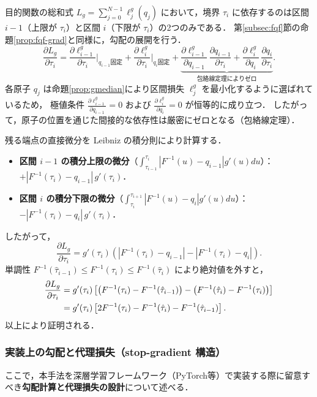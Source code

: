 \documentclass[a4paper,10pt]{jsarticle}
\makeatletter
\theoremstyle{definition}
\renewenvironment{proof}[1][\proofname]{\par
  \pushQED{\qed}%
  \normalfont \topsep6\p@\@plus6\p@\relax
  \trivlist
  \item[\hskip\labelsep\textbf{#1}]\ignorespaces
}{%
  \popQED\endtrivlist\@endpefalse
}
\renewcommand{\proofname}{証明}
\renewcommand{\Finv}{F^{-1}}
\makeatother
\begin{document}
\begin{proof}
目的関数の総和式 $L_g = \sum_{j=0}^{N-1} \ell_j^g(q_j)$ において，境界 $\tau_i$ に依存するのは区間 $i-1$（上限が $\tau_i$）と区間 $i$（下限が $\tau_i$）の2つのみである．
第\ref{subsec:fqf}節の命題\ref{prop:fqf-grad}と同様に，勾配の展開を行う．
\begin{equation}
  \frac{\partial L_g}{\partial\tau_i} = \frac{\partial \ell_{i-1}^g}{\partial\tau_i}\Bigg|_{q_{i-1}\text{固定}} + \frac{\partial \ell_i^g}{\partial\tau_i}\Bigg|_{q_i\text{固定}} + \underbrace{\frac{\partial \ell_{i-1}^g}{\partial q_{i-1}}\,\frac{\partial q_{i-1}}{\partial\tau_i} + \frac{\partial \ell_i^g}{\partial q_i}\,\frac{\partial q_i}{\partial\tau_i}}_{\text{包絡線定理によりゼロ}}.
\end{equation}
各原子 $q_j$ は命題\ref{prop:gmedian}により区間損失 $\ell_j^g$ を最小化するように選ばれているため，
極値条件 $\frac{\partial \ell_{i-1}^g}{\partial q_{i-1}} = 0$ および $\frac{\partial \ell_i^g}{\partial q_i} = 0$ が恒等的に成り立つ．
したがって，原子の位置を通じた間接的な依存性は厳密にゼロとなる（包絡線定理）．

残る端点の直接微分を Leibniz の積分則により計算する．
\begin{itemize}
  \item \textbf{区間 $i-1$ の積分上限の微分}（$\int_{\tau_{i-1}}^{\tau_i} |\Finv(u) - q_{i-1}| g'(u)du$）：
  $+|\Finv(\tau_i) - q_{i-1}|\,g'(\tau_i)$．
  \item \textbf{区間 $i$ の積分下限の微分}（$\int_{\tau_i}^{\tau_{i+1}} |\Finv(u) - q_i| g'(u)du$）：
  $-|\Finv(\tau_i) - q_i|\,g'(\tau_i)$．
\end{itemize}
したがって，
\begin{equation}
  \frac{\partial L_g}{\partial\tau_i} = g'(\tau_i)\left( |\Finv(\tau_i) - q_{i-1}| - |\Finv(\tau_i) - q_i| \right).
\end{equation}
単調性 $\Finv(\hat\tau_{i-1}) \le \Finv(\tau_i) \le \Finv(\hat\tau_i)$ により絶対値を外すと，
\begin{align}
  \frac{\partial L_g}{\partial\tau_i}
  &= g'(\tau_i)\left[ \left(\Finv(\tau_i) - \Finv(\hat\tau_{i-1})\right) - \left(\Finv(\hat\tau_i) - \Finv(\tau_i)\right) \right] \notag\\
  &= g'(\tau_i)\left[ 2\Finv(\tau_i) - \Finv(\hat\tau_i) - \Finv(\hat\tau_{i-1}) \right].
\end{align}
以上により証明される．
\end{proof}

\subsubsection{実装上の勾配と代理損失（stop-gradient 構造）}
ここで，本手法を深層学習フレームワーク（PyTorch等）で実装する際に留意すべき\textbf{勾配計算と代理損失の設計}について述べる．
\end{document}
